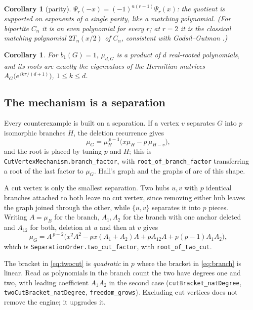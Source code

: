 \documentclass[11pt]{article}
\newtheorem{corollary}[theorem]{Corollary}
\theoremstyle{remark}
\begin{document}
\begin{corollary}[parity]\label{cor:parity}
$\Psi_r(-x)=(-1)^{n(r-1)}\Psi_r(x)$: the quotient is supported on exponents
of a single parity, like a matching polynomial. (For bipartite $C_n$ it is an
even polynomial for every $r$; at $r=2$ it is the classical matching
polynomial $2T_n(x/2)$ of $C_n$, consistent with Godsil--Gutman
\cite{GG}.)
\end{corollary}

\begin{corollary}\label{cor:unirr}
For $b_1(G)=1$, $\mu_{d,G}$ is a product of $d$ real-rooted polynomials, and its
roots are exactly the eigenvalues of the Hermitian matrices
$A_G\bigl(e^{\,ik\pi/(d+1)}\bigr)$, $1\le k\le d$.
\end{corollary}

\subsection{The mechanism is a separation}\label{sec:mechanism}

Every counterexample is built on a separation. If a vertex $v$ separates $G$ into $p$ isomorphic
branches $H$, the deletion recurrence gives
\begin{equation}\label{eq:branch}
   \mu_G=\mu_H^{\,p-1}\bigl(x\mu_H-p\,\mu_{H-v}\bigr),
\end{equation}
and the root is placed by tuning $p$ and $H$; this is
\texttt{CutVertexMechanism.branch\_factor}, with \texttt{root\_of\_branch\_factor} transferring
a root of the last factor to $\mu_G$. Hall's graph and the graphs of
\cite{Supp} are of this shape.

A cut vertex is only the smallest separation. Two hubs $u,v$ with $p$ identical branches
attached to both leave no cut vertex, since removing either hub leaves the graph joined through
the other, while $\{u,v\}$ separates it into $p$ pieces. Writing $A=\mu_B$ for the branch,
$A_1,A_2$ for the branch with one anchor deleted and $A_{12}$ for both, deletion at $u$ and then
at $v$ gives
\begin{equation}\label{eq:twocut}
   \mu_G=A^{\,p-2}\bigl(x^2A^2-px(A_1+A_2)A+pA_{12}A+p(p-1)A_1A_2\bigr),
\end{equation}
which is \texttt{SeparationOrder.two\_cut\_factor}, with \texttt{root\_of\_two\_cut}.

The bracket in \eqref{eq:twocut} is \emph{quadratic} in $p$ where the bracket in
\eqref{eq:branch} is linear. Read as polynomials in the branch count the two have degrees one and
two, with leading coefficient $A_1A_2$ in the second case
(\texttt{cutBracket\_natDegree}, \texttt{twoCutBracket\_natDegree}, \texttt{freedom\_grows}).
Excluding cut vertices does not remove the engine; it upgrades it.
\end{document}
